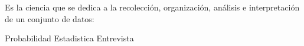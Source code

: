 
\question Es la ciencia que se dedica a la recolección, organización,
          análisis e interpretación de un conjunto de datos:

  \begin{oneparchoices}
    \choice Probabilidad
    \CorrectChoice Estadistica
    \choice Entrevista
  \end{oneparchoices}
